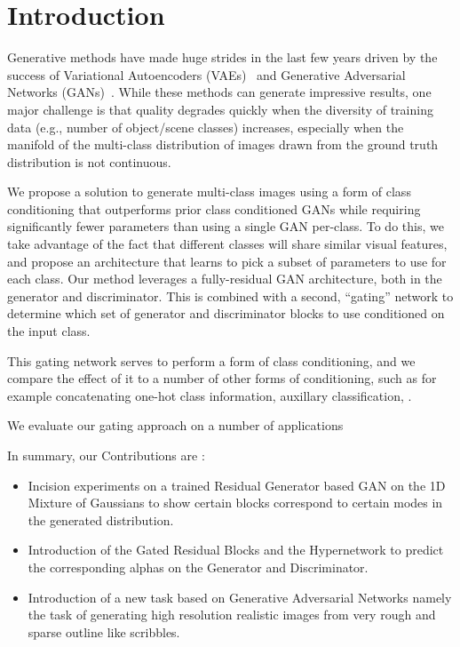 \section{Introduction}
Generative methods have made huge strides in the last few years driven by the success of Variational Autoencoders (VAEs)~\cite{kingma2013auto} and Generative Adversarial Networks (GANs)~\cite{goodfellow2014generative}. 
While these methods can generate impressive results, one major challenge is that quality degrades quickly when the diversity of training data (e.g., number of object/scene classes) increases, especially when the manifold of the multi-class distribution of images drawn from the ground truth distribution is not continuous. 

We propose a solution to generate multi-class images using a form of class conditioning that outperforms prior class conditioned GANs while requiring significantly fewer parameters than using a single GAN per-class. 
To do this, we take advantage of the fact that different classes will share similar visual features, and propose an architecture that learns to pick a subset of parameters to use for each class.
Our method leverages a fully-residual GAN architecture, both in the generator and discriminator.
This is combined with a second, ``gating'' network to determine which set of generator and discriminator blocks to use conditioned on the input class. 

This gating network serves to perform a form of class conditioning, and we compare the effect of it to a number of other forms of conditioning, such as for example concatenating one-hot class information, auxillary classification, .

We evaluate our gating approach on a number of applications 

In summary, our Contributions are :
\begin{itemize}
\item Incision experiments on a trained Residual Generator based GAN on the 1D Mixture of Gaussians to show certain blocks correspond to certain modes in the generated distribution.
\item Introduction of the Gated Residual Blocks and the Hypernetwork to predict the corresponding alphas on the Generator and Discriminator.
\item Introduction of a new task based on Generative Adversarial Networks namely the task of generating high resolution realistic images from very rough and sparse outline like scribbles.
\end{itemize}